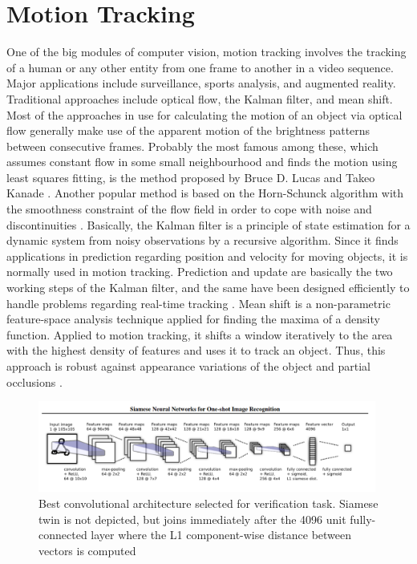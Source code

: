 \section{Motion Tracking}
    One of the big modules of computer vision, motion tracking involves the tracking of a human or any other entity from one frame to another in a video sequence. Major applications include surveillance, sports analysis, and augmented reality. Traditional approaches include optical flow, the Kalman filter, and mean shift. Most of the approaches in use for calculating the motion of an object via optical flow generally make use of the apparent motion of the brightness patterns between consecutive frames. Probably the most famous among these, which assumes constant flow in some small neighbourhood and finds the motion using least squares fitting, is the method proposed by Bruce D. Lucas and Takeo Kanade \citep{lucas1981iterative}. Another popular method is based on the Horn-Schunck algorithm with the smoothness constraint of the flow field in order to cope with noise and discontinuities \citep{chen2016full}. Basically, the Kalman filter is a principle of state estimation for a dynamic system from noisy observations by a recursive algorithm. Since it finds applications in prediction regarding position and velocity for moving objects, it is normally used in motion tracking. Prediction and update are basically the two working steps of the Kalman filter, and the same have been designed efficiently to handle problems regarding real-time tracking \citep{kalman1960new}. Mean shift is a non-parametric feature-space analysis technique applied for finding the maxima of a density function. Applied to motion tracking, it shifts a window iteratively to the area with the highest density of features and uses it to track an object. Thus, this approach is robust against appearance variations of the object and partial occlusions \citep{comaniciu2000real}.\\

    \begin{figure}[htbp]
        \centering
        \includegraphics[width=0.99\textwidth]{figures/siamese.png}
        \caption{Best convolutional architecture selected for verification task. Siamese twin is not depicted, but joins immediately after the 4096 unit fully-connected layer where the L1 component-wise distance between vectors is computed \citep{koch2015siamese}}
        \label{fig:siamese}
    \end{figure}

